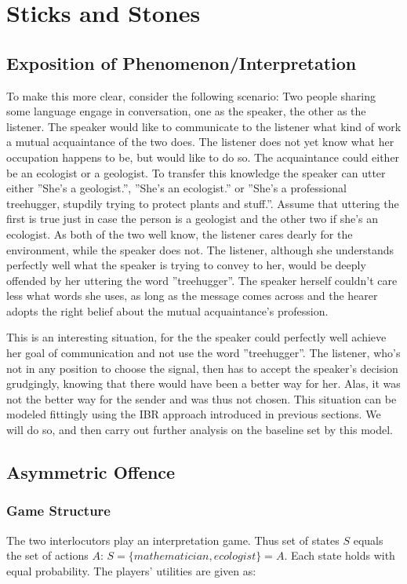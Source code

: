 \documentclass[10]{article}
\begin{document}
\section{Sticks and Stones}
\subsection{Exposition of Phenomenon/Interpretation}

To make this more clear, consider the following scenario: Two people sharing some language engage in conversation, one as the speaker, the other as the listener. The speaker would like to communicate to the listener what kind of work a mutual acquaintance of the two does. The listener does not yet know what her occupation happens to be, but would like to do so. The acquaintance could either be an ecologist or a geologist. To transfer this knowledge the speaker can utter either ''She's a geologist.'', ''She's an ecologist.'' or ''She's a professional treehugger, stupdily trying to protect plants and stuff.''. Assume that uttering the first is true just in case the person is a geologist and the other two if she's an ecologist. As both of the two well know, the listener cares dearly for the environment, while the speaker does not. The listener, although she understands perfectly well what the speaker is trying to convey to her, would be deeply offended by her uttering the word ''treehugger''. The speaker herself couldn't care less what words she uses, as long as the message comes across and the hearer adopts the right belief about the mutual acquaintance's profession.

This is an interesting situation, for the the speaker could perfectly well achieve her goal of communication and not use the word ''treehugger''. The listener, who's not in any position to choose the signal, then has to accept the speaker's decision grudgingly, knowing that there would have been a better way for her. Alas, it was not the better way for the sender and was thus not chosen. This situation can be modeled fittingly using the IBR approach introduced in previous sections. We will do so, and then carry out further analysis on the baseline set by this model.
%
\subsection{Asymmetric Offence}
\subsubsection{Game Structure}
The two interlocutors play an interpretation game. Thus set of states $S$ equals the set of actions $A$: $S=\{mathematician,ecologist\}=A$. Each state holds with equal probability. The players' utilities are given as:\\
\end{document}
